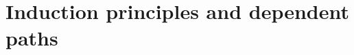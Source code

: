 \documentclass[hott-all.tex]{subfiles}
\begin{document}
\section{Induction principles and dependent paths}
% 
% 
% 
% 
\end{document}
